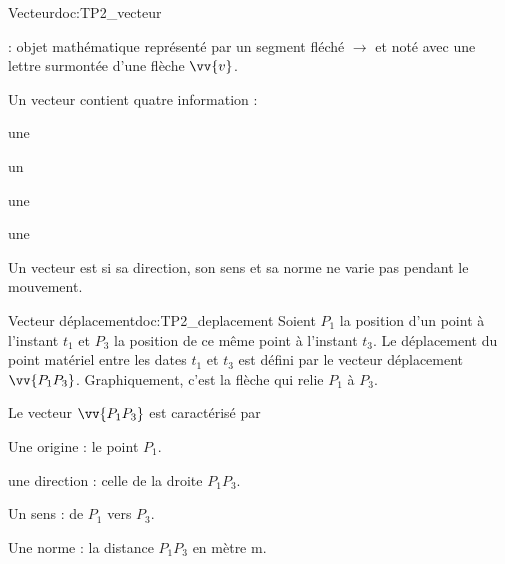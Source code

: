 \begin{doc}{Vecteur}{doc:TP2_vecteur}
  \begin{importants}
     : objet mathématique représenté par un segment fléché $\longrightarrow$ et noté avec une lettre surmontée d'une flèche $\vv{v}$.
    
    Un vecteur contient quatre information : 
    
    \vspace*{-4pt}
    \begin{multicols}{2}
      \begin{listePoints}
        \item une 
        \item un 
        \item une 
        \item une 
      \end{listePoints}
    \end{multicols}
    \vspace*{-4pt}
  
    Un vecteur est  si sa direction, son sens et sa norme ne varie pas pendant le mouvement.
  \end{importants}
\end{doc}

\pasCorrection{
\newpage
\vspace*{-40pt}
}
\begin{doc}{Vecteur déplacement}{doc:TP2_deplacement}
  Soient $P_1$ la position d'un point à l'instant $t_1$ et $P_3$ la position de ce même point à l'instant $t_3$.
  Le déplacement du point matériel entre les dates $t_1$ et $t_3$ est défini par le vecteur déplacement $\vv{P_1 P_3}$.
  Graphiquement, c'est la flèche qui relie $P_1$ à $P_3$. 
  
  Le vecteur $\vv{P_1 P_3}$ est caractérisé par
  \vspace*{-8pt}
  \begin{multicols}{2}
  \begin{listePoints}
    \item Une origine : le point $P_1$.
    \item une direction : celle de la droite $P_1 P_3$.
    \item Un sens : de $P_1$ vers $P_3$.
    \item Une norme : la distance $P_1 P_3$ en mètre \unit{m}.
  \end{listePoints}
  \end{multicols}
\end{doc}

